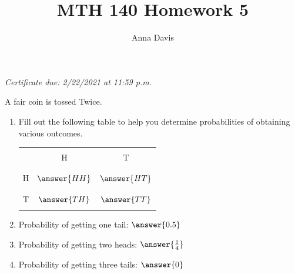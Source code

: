 \documentclass{ximera}
\author{Anna Davis} \title{MTH 140 Homework 5}
\begin{document}
\begin{abstract}

\end{abstract}
\maketitle
 \textit{Certificate due: 2/22/2021 at 11:59 p.m.}
 
 \begin{problem}\label{prob:140hom4prob1}
A fair coin is tossed Twice.  
\begin{enumerate}
    \item Fill out the following table to help you determine probabilities of obtaining various outcomes.
    
\begin{center}
\begin{tabular}{|c|c|c|}
 \hline
 &&   \\
 & H& T  \\
 &&   \\
  \hline
  &&\\
 H&$\answer{HH}$&$\answer{HT}$ \\
  && \\
 \hline
  &&\\
 T&$\answer{TH}$&$\answer{TT}$ \\
  && \\
 \hline
 \end{tabular}
\end{center}    
\item Probability of getting one tail: $\answer{0.5}$

\item Probability of getting two heads: $\answer{\frac{1}{4}}$
\item Probability of getting three tails: $\answer{0}$
\end{enumerate}
\end{problem}
\end{document}
